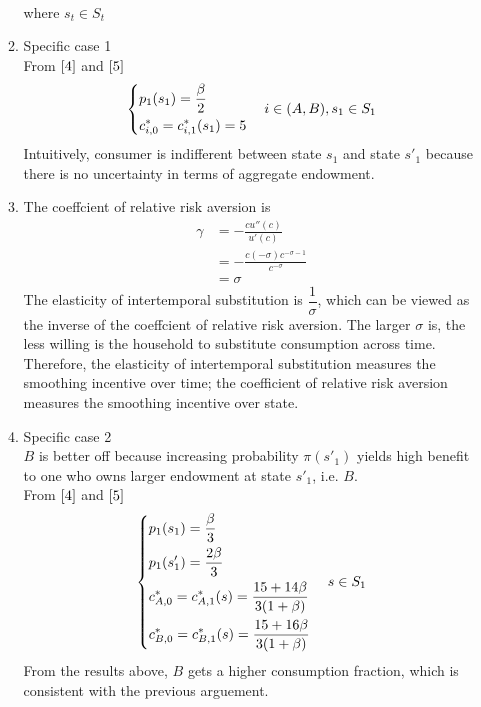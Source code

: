 \documentclass{article}
\begin{document}
\begin{enumerate}
\begin{enumerate}
\begin{align}
            \end{align}
            where \(s_t\in S_t\)
            \item Specific case 1\\
            From \(\eqref{4}\) and \(\eqref{5}\)
            \[\begin{dcases}
                p_1(s_1)=\frac{\beta}{2}\\
                c_{i,0}^\ast=c_{i,1}^\ast(s_1)=5
            \end{dcases}\quad i\in(A,B),s_1\in S_1\]
            Intuitively, consumer is indifferent between state \(s_1\) and state \(s'_1\) because there is no uncertainty in terms of aggregate endowment.
            \item The coeffcient of relative risk aversion is 
            \begin{align*}
                \gamma&=-\frac{cu''(c)}{u'(c)}\\
                &=-\frac{c(-\sigma)c^{-\sigma-1}}{c^{-\sigma}}\\
                &=\sigma
            \end{align*}
            The elasticity of intertemporal substitution is \(\dfrac{1}{\sigma}\), which can be viewed as the inverse of the coeffcient of relative risk aversion.
            The larger \(\sigma\) is, the less willing is the household to substitute consumption across time.
            Therefore, the elasticity of intertemporal substitution measures the smoothing incentive over time;
            the coefficient of relative risk aversion measures the smoothing incentive over state.
            \item Specific case 2\\
            \(B\) is better off because increasing probability \(\pi(s'_1)\) yields high benefit to one who owns larger endowment at state \(s'_1\), i.e. \(B\).\\
            From \(\eqref{4}\) and \(\eqref{5}\)
            \[\begin{dcases}
                p_1(s_1)=\frac{\beta}{3}\\
                p_1(s'_1)=\frac{2\beta}{3}\\
                c_{A,0}^\ast=c_{A,1}^\ast(s)=\frac{15+14\beta}{3(1+\beta)}\\
                c_{B,0}^\ast=c_{B,1}^\ast(s)=\frac{15+16\beta}{3(1+\beta)}
            \end{dcases}\quad s\in S_1\]
            From the results above, \(B\) gets a higher consumption fraction, which is consistent with the previous arguement. 

\end{enumerate}
\end{enumerate}
\end{document}
